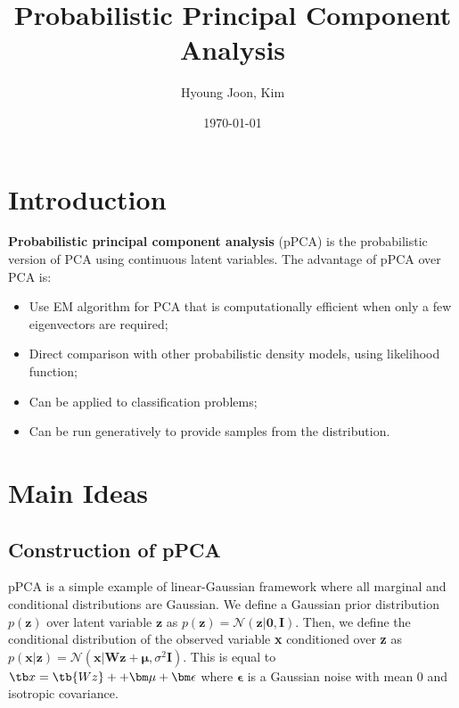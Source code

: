 \documentclass{article}
\title{Probabilistic Principal Component Analysis}
\author{Hyoung Joon, Kim}
\date{\today}
\begin{document}
\maketitle
\tableofcontents
\newpage

\section{Introduction}
    \textbf{Probabilistic principal component analysis} (pPCA) is the probabilistic version of PCA
    using continuous latent variables. The advantage of pPCA over PCA is:
    \begin{itemize}
        \item Use EM algorithm for PCA that is computationally efficient when only a few eigenvectors are required;
        \item Direct comparison with other probabilistic density models, using likelihood function;
        \item Can be applied to classification problems;
        \item Can be run generatively to provide samples from the distribution.
    \end{itemize}
\section{Main Ideas}
    \subsection{Construction of pPCA}
        pPCA is a simple example of linear-Gaussian framework where all marginal and conditional distributions are Gaussian.
        We define a Gaussian prior distribution $p(\textbf{z})$ over latent variable $\textbf{z}$ as $p(\textbf{z})=\mathcal{N}(\textbf{z}|\textbf{0},\textbf{I})$.
        Then, we define the conditional distribution of the observed variable \textbf{x} conditioned over \textbf{z} as
        $p(\textbf{x}|\textbf{z})=\mathcal{N}(\textbf{x}|\textbf{Wz}+\bm\mu,\sigma^2\textbf{I})$.
        This is equal to $\tb x = \tb{Wz} + +\bm\mu + \bm\epsilon$ where $\bm\epsilon$ is a Gaussian noise with mean 0 and isotropic covariance.
\end{document}
